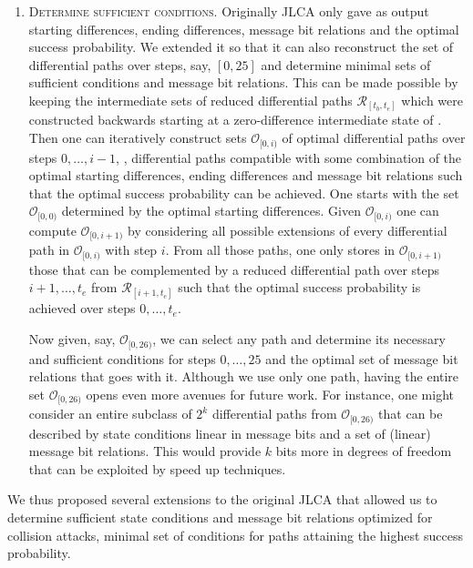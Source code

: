 \begin{enumerate}
\item \textsc{Determine sufficient conditions.} Originally JLCA only gave as output starting differences, ending differences, message bit relations and the optimal success probability. 
We extended it so that it can also reconstruct the set of differential paths over steps, say, $[0,25]$ and determine minimal sets of sufficient conditions and message bit relations.
This can be made possible by keeping the intermediate sets of reduced differential paths $\mathcal{R}_{[t_b,t_e]}$ which were constructed backwards starting at a zero-difference intermediate state of \shaone.
Then one can iteratively construct sets $\mathcal{O}_{[0,i)}$ of optimal differential paths over steps $0,\ldots,i-1$, \ie,
differential paths compatible with some combination of the optimal starting differences, ending differences and message bit relations such that the optimal success probability can be achieved.
One starts with the set $\mathcal{O}_{[0,0)}$ determined by the optimal starting differences.
Given $\mathcal{O}_{[0,i)}$ one can compute $\mathcal{O}_{[0,i+1)}$ by considering
all possible extensions of every differential path in $\mathcal{O}_{[0,i)}$ with step $i$.
From all those paths, one only stores in $\mathcal{O}_{[0,i+1)}$ those that can be complemented by a reduced differential path over steps $i+1,\ldots,t_e$ from $\mathcal{R}_{[i+1,t_e]}$ such that the optimal success probability is achieved over steps $0,\ldots,t_e$.

Now given, say, $\mathcal{O}_{[0,26)}$, we can select any path and determine its necessary and sufficient conditions for steps $0,\ldots,25$ and the optimal set of message bit relations that goes with it.
Although we use only one path, having the entire set $\mathcal{O}_{[0,26)}$ opens even more avenues for future work.
For instance, one might consider an entire subclass of $2^k$ differential paths from $\mathcal{O}_{[0,26)}$ that can be described by state conditions linear in message bits and a set of (linear) message bit relations.
This would provide $k$ bits more in degrees of freedom that can be exploited by speed up techniques.
\end{enumerate}
We thus proposed several extensions to the original JLCA that allowed us to determine sufficient state conditions and message bit relations optimized for collision attacks,
\ie minimal set of conditions for paths attaining the highest success probability.

